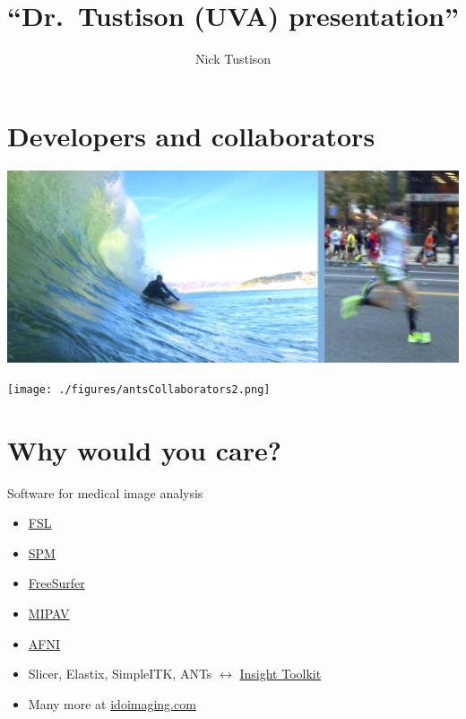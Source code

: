 \documentclass[ignorenonframetext,]{beamer}
\institute{University of Virginia}
\title{``Dr.~Tustison (UVA) presentation''}
\author{Nick Tustison}
\date{}
\begin{document}
\frame{\titlepage}

\section{Developers and
collaborators}\label{developers-and-collaborators}

\includegraphics{./figures/brian_and_nick.png}

\begin{frame}

\texttt{[image: ./figures/antsCollaborators2.png]}

\end{frame}

\section{Why would you care?}\label{why-would-you-care}

\begin{frame}{Software for medical image analysis}

\begin{itemize}
\item
  \href{http://fsl.fmrib.ox.ac.uk/fsldownloads/}{FSL}
\item
  \href{http://www.fil.ion.ucl.ac.uk/spm/software/}{SPM}
\item
  \href{http://www.fil.ion.ucl.ac.uk/spm/software/}{FreeSurfer}
\item
  \href{http://mipav.cit.nih.gov}{MIPAV}
\item
  \href{https://afni.nimh.nih.gov/afni}{AFNI}
\item
  Slicer, Elastix, SimpleITK, ANTs \(\longleftrightarrow\)
  \href{http://www.itk.org}{Insight Toolkit}
\item
  Many more at \href{http://idoimaging.com}{idoimaging.com}
\end{itemize}

\end{frame}
\end{document}
